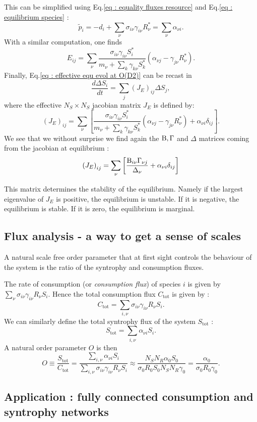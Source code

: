 \documentclass[12pt, titlepage]{report}
\begin{document}
This can be simplified using Eq.\eqref{eq : equality fluxes resource} and Eq.\eqref{eq : equilibrium species} :
\begin{equation}
\tilde{p}_i=-d_i +\sum_\nu \sigma_{i\nu}\gamma_{i\nu}R^*_\nu = \sum_\nu \alpha_{\nu i}.
\end{equation}
With a similar computation, one finds
\begin{equation}
E_{ij}=\sum_\nu \frac{\sigma_{i\nu}\gamma_{i\nu}S^*_i}{m_\nu+\sum_k \gamma_{k\nu}S^*_k} \left(\alpha_{\nu j}-\gamma_{j\nu}R^*_\nu\right).
\end{equation}
Finally, Eq.\eqref{eq : effective equ evol at O(D2)} can be recast in
\begin{equation}
\frac{d\Delta S_i}{dt} = \sum_j (J_E)_{ij} \Delta S_j,
\end{equation}
where the effective $N_S\times N_S$ jacobian matrix $J_E$ is defined by:
\begin{equation}
(J_E)_{ij}=\sum_\nu \left[\frac{\sigma_{i\nu}\gamma_{i\nu}S^*_i}{m_\nu+\sum_k \gamma_{k\nu}S^*_k} \left(\alpha_{\nu j}-\gamma_{j\nu}R^*_\nu\right)+\alpha_{\nu i}\delta_{ij}\right].
\end{equation}
We see that we without surprise we find again the $\text{B}, \Gamma $ and $\Delta$ matrices coming from the jacobian at equilibrium :
\begin{equation}
\left(J_E\right)_{ij}=\sum_\nu \left[\frac{\text{B}_{i\nu}\Gamma_{\nu j}}{\Delta_\nu}+\alpha_{\nu i} \delta_{ij}\right]
\end{equation}

This matrix determines the stability of the equilibrium. Namely if the largest eigenvalue of $J_E$ is positive, the equilibrium is unstable. If it is negative, the equilibrium is stable. If it is zero, the equilibrium is marginal.



\subsection{Flux analysis - a way to get a sense of scales}
A natural scale free order parameter that at first sight controls the behaviour of the system is the ratio of the syntrophy and consumption fluxes.

The rate of consumption (or \textit{consumption flux}) of species $i$ is given by $\sum_\nu \sigma_{i\nu}\gamma_{i\nu}R_\nu S_i$. Hence the total consumption flux $C_{\text{tot}}$ is given by :
\begin{equation}
C_{\text{tot}} = \sum_{i, \nu} \sigma_{i\nu} \gamma_{i\nu}R_\nu S_i.
\end{equation}
We can similarly define the total syntrophy flux of the system $S_{\text{tot}}$ :
\begin{equation}
S_{\text{tot}} = \sum_{i, \nu} \alpha_{\nu i} S_i.
\end{equation}
A natural order parameter $O$ is then
\begin{equation}
O \equiv \frac{S_{\text{tot}}}{C_{\text{tot}}} = \frac{\sum_{i, \nu} \alpha_{\nu i} S_i}{\sum_{i,\nu}\sigma_{i\nu} \gamma_{i\nu}R_\nu S_i} \approx \frac{N_S N_R \alpha_0 S_0}{\sigma_0 R_0 S_0 N_S N_R \gamma_0} = \frac{\alpha_0}{\sigma_0 R_0 \gamma_0}.
\end{equation}

\subsection{Application : fully connected consumption and syntrophy networks}

\end{document}
